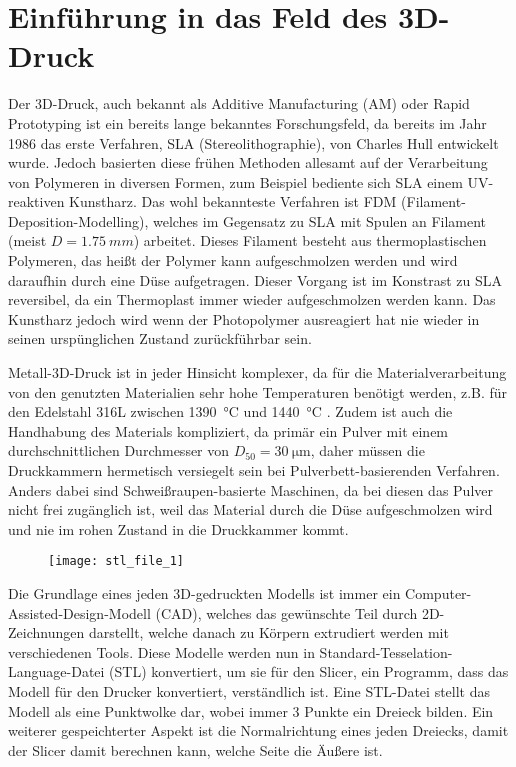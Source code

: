 \documentclass[../main.tex]{subfiles}
\begin{document}
\section{Einführung in das Feld des 3D-Druck}
Der 3D-Druck, auch bekannt als Additive Manufacturing (AM) oder Rapid Prototyping ist ein bereits lange bekanntes Forschungsfeld, da bereits im Jahr 1986 das erste Verfahren, SLA (Stereolithographie), von Charles Hull entwickelt wurde. Jedoch basierten diese frühen Methoden allesamt auf der Verarbeitung von Polymeren in diversen Formen, zum Beispiel bediente sich SLA einem UV-reaktiven Kunstharz. Das wohl bekannteste Verfahren ist FDM (Filament-Deposition-Modelling), welches im Gegensatz zu SLA mit Spulen an Filament (meist $D=\qty{1.75}{mm}$) arbeitet. Dieses Filament besteht aus thermoplastischen Polymeren, das heißt der Polymer kann aufgeschmolzen werden und wird daraufhin durch eine Düse aufgetragen. Dieser Vorgang ist im Konstrast zu SLA reversibel, da ein Thermoplast immer wieder aufgeschmolzen werden kann.\parencite{BHATIA20231060} Das Kunstharz jedoch wird wenn der Photopolymer ausreagiert hat nie wieder in seinen urspünglichen Zustand zurückführbar sein.\parencite{FACUNDO_1}

Metall-3D-Druck ist in jeder Hinsicht komplexer, da für die Materialverarbeitung von den genutzten Materialien sehr hohe Temperaturen benötigt werden, z.B. für den Edelstahl 316L zwischen \qty{1390}{\celsius} und \qty{1440}{\degreeCelsius} \parencite{610LSTEEL}. Zudem ist auch die Handhabung des Materials kompliziert, da primär ein Pulver mit einem durchschnittlichen Durchmesser von $D_{50}=\SI{30}{\micro\meter}$\parencite[~S.3]{ZAKRZEWSKI2020115}, daher müssen die Druckkammern hermetisch versiegelt sein bei Pulverbett-basierenden Verfahren.
Anders dabei sind Schweißraupen-basierte Maschinen, da bei diesen das Pulver nicht frei zugänglich ist, weil das Material durch die Düse aufgeschmolzen wird und nie im rohen Zustand in die Druckkammer kommt.

\begin{figure}[h!]
\begin{center}
	\texttt{[image: stl\_file\_1]}
	\label{img:stl_1}
\end{center}
\end{figure}	

Die Grundlage eines jeden 3D-gedruckten Modells ist immer ein Computer-Assisted-Design-Modell (CAD), welches das gewünschte Teil durch 2D-Zeichnungen darstellt, welche danach zu Körpern extrudiert werden mit verschiedenen Tools. Diese Modelle werden nun in Standard-Tesselation-Language-Datei (STL) konvertiert, um sie für den Slicer, ein Programm, dass das Modell für den Drucker konvertiert, verständlich ist. Eine STL-Datei stellt das Modell als eine Punktwolke dar, wobei immer 3 Punkte ein Dreieck bilden. Ein weiterer gespeichterter Aspekt ist die Normalrichtung eines jeden Dreiecks, damit der Slicer damit berechnen kann, welche Seite die Äußere ist. 
\end{document}
